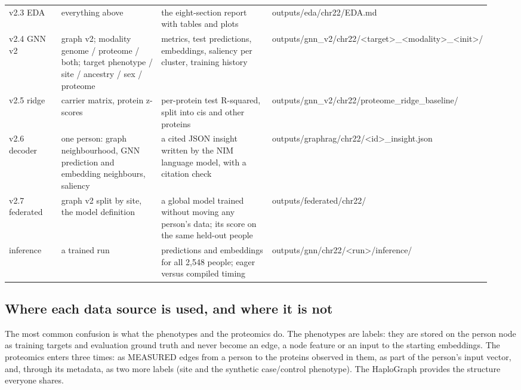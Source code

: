 \documentclass[11pt,a4paper]{article}
\begin{document}
\begin{longtable}{p{0.132\linewidth}p{0.282\linewidth}p{0.357\linewidth}p{0.169\linewidth}}
v2.3 EDA & everything above & the eight-section report with tables and plots & outputs/eda/chr22/EDA.md \\
v2.4 GNN v2 & graph v2; modality genome / proteome / both; target phenotype / site / ancestry / sex / proteome & metrics, test predictions, embeddings, saliency per cluster, training history & outputs/gnn\_v2/chr22/<target>\_<modality>\_<init>/ \\
v2.5 ridge & carrier matrix, protein z-scores & per-protein test R-squared, split into cis and other proteins & outputs/gnn\_v2/chr22/proteome\_ridge\_baseline/ \\
v2.6 decoder & one person: graph neighbourhood, GNN prediction and embedding neighbours, saliency & a cited JSON insight written by the NIM language model, with a citation check & outputs/graphrag/chr22/<id>\_insight.json \\
v2.7 federated & graph v2 split by site, the model definition & a global model trained without moving any person's data; its score on the same held-out people & outputs/federated/chr22/ \\
inference & a trained run & predictions and embeddings for all 2,548 people; eager versus compiled timing & outputs/gnn/chr22/<run>/inference/ \\
\bottomrule
\end{longtable}

\subsection{Where each data source is used, and where it is not}

The most common confusion is what the phenotypes and the proteomics do. The phenotypes are labels: they are stored on the person node as training targets and evaluation ground truth and never become an edge, a node feature or an input to the starting embeddings. The proteomics enters three times: as MEASURED edges from a person to the proteins observed in them, as part of the person's input vector, and, through its metadata, as two more labels (site and the synthetic case/control phenotype). The HaploGraph provides the structure everyone shares.
\end{document}
